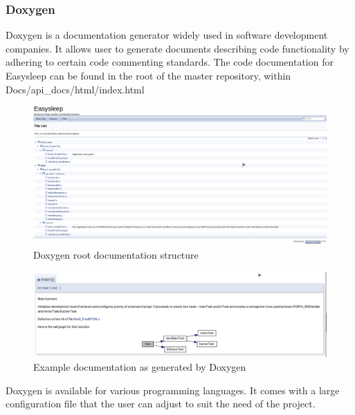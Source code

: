 \documentclass[12pt,a4paper]{article}
\begin{document}
            \subsubsection{Doxygen}
            Doxygen is a documentation generator widely used in software development companies. It
            allows user to generate documents describing code functionality by adhering 
            to certain code commenting standards. The code documentation for Easysleep can be found in the root of the master repository, within Docs/api\_docs/html/index.html\\
            
            \begin{figure}[h]
                \centering
                \includegraphics[width=\textwidth]{doxygen_root.png}
                \caption{Doxygen root documentation structure}
                \label{fig:doxygenRoot}
            \end{figure}
            
            \begin{figure}[h]
                \centering
                \includegraphics[width=\textwidth]{doxygen_main_dev2.png}
                \caption{Example documentation as generated by Doxygen}
                \label{fig:doxygenMain}
            \end{figure}
            
            
            Doxygen is available for various programming languages. It comes with a large configuration 
            file that the user can adjust to suit the need of the project.
            
\end{document}
